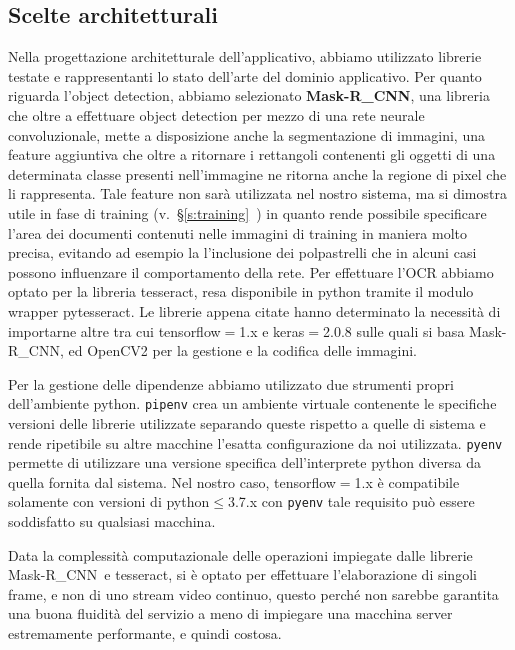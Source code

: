 \documentclass[12pt,a4paper]{article}
\newcommand{\mrcnn}{Mask-R\_CNN}
\begin{document}
\subsection{Scelte architetturali}

Nella progettazione architetturale dell'applicativo, abbiamo utilizzato
librerie testate e rappresentanti lo stato dell'arte del dominio
applicativo. Per quanto riguarda l'object detection, abbiamo selezionato
\textbf{\mrcnn}, una libreria che oltre a effettuare object detection
per mezzo di una rete neurale convoluzionale, mette a disposizione anche
la segmentazione di immagini, una feature aggiuntiva che oltre a
ritornare i rettangoli contenenti gli oggetti di una determinata classe
presenti nell'immagine ne ritorna anche la regione di pixel che li
rappresenta. Tale feature non sarà utilizzata nel nostro sistema, ma si
dimostra utile in fase di training
(v.~§\ref{s:training}~) in quanto rende possibile
specificare l'area dei documenti contenuti nelle immagini di training in
maniera molto precisa, evitando ad esempio la l'inclusione dei
polpastrelli che in alcuni casi possono influenzare il comportamento
della rete. Per effettuare l'OCR abbiamo optato per la libreria
tesseract, resa disponibile in python tramite il modulo wrapper
pytesseract. Le librerie appena citate hanno determinato la necessità di
importarne altre tra cui tensorflow$=$1.x e keras$=$2.0.8 sulle quali si
basa \mrcnn, ed OpenCV2 per la gestione e la codifica delle immagini.

Per la gestione delle dipendenze abbiamo utilizzato due strumenti propri
dell'ambiente python. \texttt{pipenv} crea un ambiente virtuale
contenente le specifiche versioni delle librerie utilizzate separando
queste rispetto a quelle di sistema e rende ripetibile su altre macchine
l'esatta configurazione da noi utilizzata. \texttt{pyenv} permette di
utilizzare una versione specifica dell'interprete python diversa da
quella fornita dal sistema. Nel nostro caso, tensorflow$=$1.x è
compatibile solamente con versioni di python$\leq$3.7.x con
\texttt{pyenv} tale requisito può essere soddisfatto su qualsiasi
macchina.

Data la complessità computazionale delle operazioni impiegate
dalle librerie \mrcnn\ e tesseract, si è optato per effettuare
l'elaborazione di singoli frame, e non di uno stream video
continuo, questo perché non sarebbe garantita una buona fluidità
del servizio a meno di impiegare una macchina server estremamente
performante, e quindi costosa.
\end{document}
